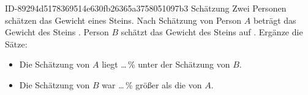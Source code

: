 \begin{exercise}
      {ID-89294d5178369514e630fb26365a3758051097b3}
      {Schätzung}
  \ifproblem\problem
    Zwei Personen schätzen das Gewicht eines Steins.
    Nach Schätzung von Person $A$ beträgt das Gewicht des Steins .
    Person $B$ schätzt das Gewicht des Steins auf . Ergänze die Sätze:
    \begin{itemize}
      \item Die Schätzung von $A$ liegt \ldots\,\% unter der Schätzung von $B$.
      \item Die Schätzung von $B$ war \ldots\,\% größer als die von $A$.
    \end{itemize}
  \fi
\end{exercise}
